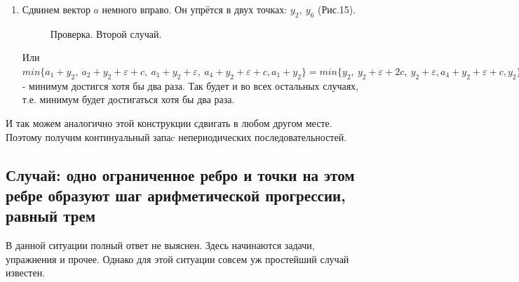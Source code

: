 \documentclass[russian]{lecture-notes}
\begin{document}
\begin{enumerate}
Или $min\{a_1+y_2+c+\varepsilon,\ a_2+y_2+\varepsilon,\ a_1+y_2+\varepsilon+c,\ a_4+y_2, a_1+y_2+\varepsilon+c\}=min\{y_2+\varepsilon+c,\ y_2+\varepsilon+c,\ y_2+\varepsilon+c, a_4+y_2, y_2+\varepsilon+c\}=y_2+\varepsilon+c$ - минимум достигся больше двух раз.
\item
Сдвинем вектор $a$ немного вправо. Он упрётся в двух точках: $y_2,\ y_6$  (Рис.15).
\begin{figure}[h!]
\caption{Проверка. Второй случай.}
\end{figure}
Или $min\{a_1+y_2,\ a_2+y_2+\varepsilon+c,\ a_1+y_2+\varepsilon,\ a_4+y_2+\varepsilon+c, a_1+y_2\}=min\{y_2,\ y_2+\varepsilon+2c,\ y_2+\varepsilon, a_4+y_2+\varepsilon+c, y_2\}=y_2$ - минимум достигся хотя бы два раза. Так будет и во всех остальных случаях, т.е. минимум будет достигаться хотя бы два раза. 
\end{enumerate}



И так можем аналогично этой конструкции сдвигать в любом другом месте. Поэтому получим континуальный запаc непериодических последовательностей.
\subsection{Случай: одно ограниченное ребро и точки на этом ребре образуют шаг арифметической прогрессии, равный трем}

В данной ситуации полный ответ не выяснен. Здесь начинаются задачи, упражнения и прочее. Однако для этой ситуации совсем уж простейший случай известен. \\
\end{document}
